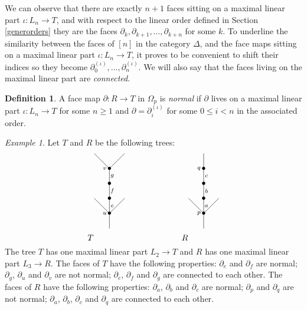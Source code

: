 \documentclass[a4paper]{amsart}
\theoremstyle{plain}
\theoremstyle{definition}
\newtheorem{dfn}[thm]{Definition}
\theoremstyle{remark}
\newtheorem{exa}[thm]{Example}
\newcommand{\rpd}{\Omega_p}
\newcommand{\To}{\longrightarrow}
\numberwithin{equation}{section}
\numberwithin{figure}{section}
\begin{document}
We can observe that there are exactly $n+1$ faces sitting on a maximal linear part $\iota\colon L_n\To T$, and with respect to the linear order defined in Section \ref{generorders} they are the faces $\partial_k, \partial_{k+1},\ldots,\partial_{k+n}$ for some $k$. To underline the similarity between the faces of $[n]$ in the category $\Delta$, and the face maps sitting on a maximal linear part $\iota\colon L_n\To T$, it proves to be convenient to shift their indices so they become $\partial^{(\iota)}_0,\ldots, \partial^{(\iota)}_n$. We will also say that the faces living on
the maximal linear part are \emph{connected}.

\begin{dfn}
    A face map $\partial\colon R\longrightarrow T$ in $\rpd$ is \emph{normal} if $\partial$ lives on a maximal linear part
    $\iota\colon L_n\longrightarrow T$ for some $n\ge 1$ and $\partial=\partial_i^{(\iota)}$ for some $0\le i<n$ in the associated order.
\end{dfn}

\begin{exa}
    Let $T$ and $R$ be the following trees:
    $$
        \xy<0.08cm,0cm>:
        (0,0)*{
        \xy
        (-10,-5)*{T};
        (0,0)*=0{}="1";
        (0,8)*=0{\bullet}="2";
        (-8,16)*=0{}="3";
        (0,16)*=0{\bullet}="4";
        (8,16)*=0{}="5";
        (0,24)*=0{\bullet}="6";
        (0,32)*=0{\bullet}="7";
        (-8,40)*=0{}="8";
        (8,40)*=0{}="9";
        (-2.5,32)*{\scriptstyle v};
        (-2.5,8)*{\scriptstyle u};
        (1.5,28)*{\scriptstyle g};
        (1.5,20)*{\scriptstyle f};
        (1.5,12)*{\scriptstyle e};
        "1";"2" **\dir{-};
        "2";"3" **\dir{-};
        "2";"4" **\dir{-};
        "2";"5" **\dir{-};
        "4";"6" **\dir{-};
        "6";"7" **\dir{-};
        "7";"8" **\dir{-};
        "7";"9" **\dir{-};
        \endxy
        };
        (50,0)*{
        \xy
        (-10,-5)*{R};
        (0,0)*=0{}="1";
        (0,8)*=0{\bullet}="2";
        (-8,16)*=0{}="3";
        (0,16)*=0{\bullet}="4";
        (8,16)*=0{}="5";
        (0,24)*=0{\bullet}="6";
        (0,32)*=0{\bullet}="7";
        (0,40)*=0{}="8";
        (-2.5,32)*{\scriptstyle q};
        (-2.5,8)*{\scriptstyle p};
        (1.5,28)*{\scriptstyle c};
        (1.5,20)*{\scriptstyle b};
        (1.5,12)*{\scriptstyle a};
        "1";"2" **\dir{-};
        "2";"3" **\dir{-};
        "2";"4" **\dir{-};
        "2";"5" **\dir{-};
        "4";"6" **\dir{-};
        "6";"7" **\dir{-};
        "7";"8" **\dir{-};
        \endxy
        };
        \endxy
    $$
    The tree $T$ has one maximal linear part $L_2\To T$ and $R$ has one maximal linear part $L_3\To R$.
    The faces of $T$ have the following properties: $\partial_e$ and $\partial_f$ are normal; $\partial_g$, $\partial_u$ and $\partial_v$ are not normal; $\partial_e$, $\partial_f$ and $\partial_g$ are connected to each other. The faces of $R$ have the following properties: $\partial_a$, $\partial_b$ and $\partial_c$ are normal; $\partial_p$ and $\partial_q$ are not normal; $\partial_a$, $\partial_b$, $\partial_c$ and $\partial_q$ are connected to each other.
\end{exa}
\end{document}
